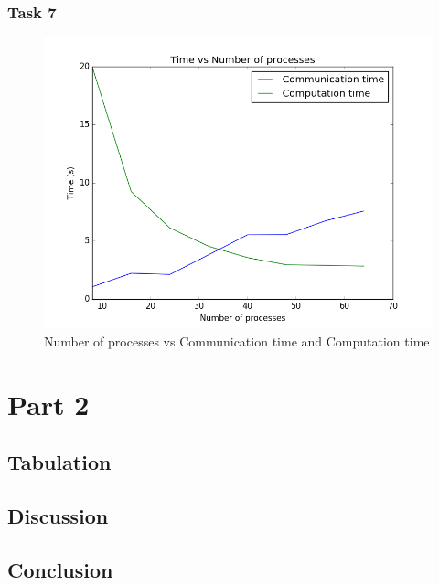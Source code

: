 \documentclass[12pt]{article}
\begin{document}
  \subsubsection*{Task 7}
    \begin{figure}[ht]
      \centering
      \includegraphics[width=0.5\linewidth]{lab2_task7}
      \caption{Number of processes vs Communication time and Computation
      time}
      \label{fig:lab2_task7}
    \end{figure}


\section{Part 2}

\subsection{Tabulation}
\subsection{Discussion}
\subsection{Conclusion}
\end{document}
